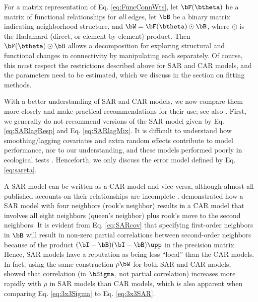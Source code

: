 For a matrix representation of Eq. \ref{eq:FuncConnWts}, let $\bF(\btheta)$ be a matrix of functional relationships for \textit{all} edges, let $\bB$ be a binary matrix indicating neighborhood structure, and $\bW = \bF(\btheta) \odot \bB$, where $\odot$ is the Hadamard (direct, or element by element) product. Then $\bF(\btheta) \odot \bB$ allows a decomposition for exploring structural and functional changes in connectivity by manipulating each separately. Of course, this must respect the restrictions described above for SAR and CAR models, and the parameters need to be estimated, which we discuss in the section on fitting methods.

With a better understanding of SAR and CAR models, we now compare them more closely and make practical recommendations for their use; see also \citet{Wall:clos:2004}. First, we generally do not recommend versions of the SAR model given by Eq. \ref{eq:SARlagResp} and Eq. \ref{eq:SARlagMix}.  It is difficult to understand how smoothing/lagging covariates and extra random effects contribute to model performance, nor to our understanding, and these models performed poorly in ecological tests \citep{Dorm:etal:meth:2007, Kiss:Carl:spat:2008}. Henceforth, we only discuss the error model defined by Eq. \ref{eq:sareta}. 

A SAR model can be written as a CAR model and vice versa, although almost all published accounts on their relationships are incomplete \citep{Ver:Hank:Hoot:2017}. \citet[pg. 408]{Cres:stat:1993} demonstrated how a SAR model with four neighbors (rook's neighbor) results in a CAR model that involves all eight neighbors (queen's neighbor) plus rook's move to the second neighbors. It is evident from Eq. \ref{eq:SARcov} that specifying first-order neighbors in $\bB$ will result in non-zero partial correlations between second-order neighbors because of the product $(\bI - \bB)(\bI - \bB)\upp$ in the precision matrix.  Hence, SAR models have a reputation as being less ``local'' than the CAR models.  In fact, using the same construction $\rho\bW$ for both SAR and CAR models, \citet{Wall:clos:2004} showed that correlation (in $\bSigma$, not partial correlation) increases more rapidly with $\rho$ in SAR models than CAR models, which is also apparent when comparing Eq. \ref{eq:3x3Sigma} to Eq. \ref{eq:3x3SAR}. 


